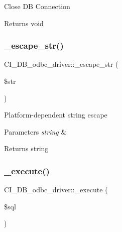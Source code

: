 Close DB Connection

\begin{DoxyReturn}{Returns}
void 
\end{DoxyReturn}
\mbox{\label{class_c_i___d_b__odbc__driver_a82845dc079a13038e5cac8261f367ccd}} 
\subsubsection{\texorpdfstring{\+\_\+escape\+\_\+str()}{\_escape\_str()}}
{\footnotesize\ttfamily C\+I\+\_\+\+D\+B\+\_\+odbc\+\_\+driver\+::\+\_\+escape\+\_\+str (\begin{DoxyParamCaption}\item[{}]{\$str }\end{DoxyParamCaption})\hspace{0.3cm}{\ttfamily [protected]}}

Platform-\/dependent string escape


\begin{DoxyParams}{Parameters}
{\em string} & \\
\hline
\end{DoxyParams}
\begin{DoxyReturn}{Returns}
string 
\end{DoxyReturn}
\mbox{\label{class_c_i___d_b__odbc__driver_a16be72853726c6da73cb9fce8031cd5a}} 
\subsubsection{\texorpdfstring{\+\_\+execute()}{\_execute()}}
{\footnotesize\ttfamily C\+I\+\_\+\+D\+B\+\_\+odbc\+\_\+driver\+::\+\_\+execute (\begin{DoxyParamCaption}\item[{}]{\$sql }\end{DoxyParamCaption})\hspace{0.3cm}{\ttfamily [protected]}}

